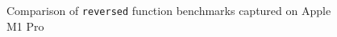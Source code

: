 \begin{figure}
    
    \caption{Comparison of \texttt{reversed} function benchmarks captured on
        Apple M1 Pro}
\end{figure}



















